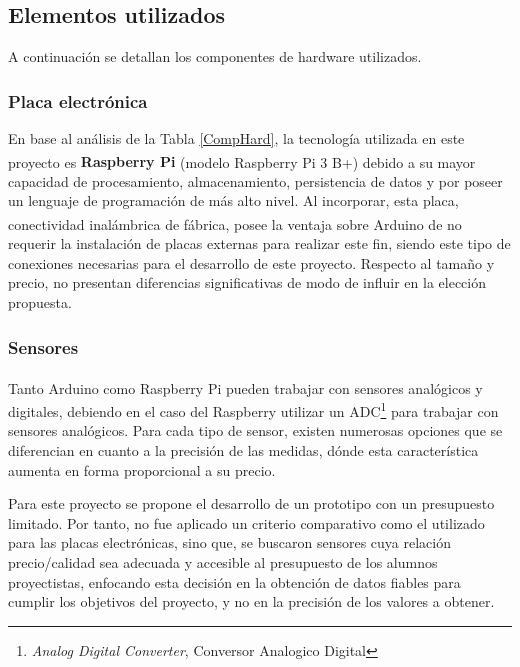         
    \subsection{Elementos utilizados}
    \label{subseccionElementosutilizados}
        \par A continuación se detallan los componentes de hardware utilizados.
        
        \subsubsection{Placa electrónica}
            \par En base al análisis de la Tabla \ref{CompHard}, la tecnología utilizada en este proyecto es \textbf{Raspberry\textsuperscript{\textregistered} Pi} (modelo Raspberry\textsuperscript{\textregistered} Pi 3 B+) debido a su mayor capacidad de procesamiento, almacenamiento, persistencia de datos y por poseer un lenguaje de programación de más alto nivel. Al incorporar, esta placa, conectividad inalámbrica de fábrica, posee la ventaja sobre Arduino\textsuperscript{\textregistered} de no requerir la instalación de placas externas para realizar este fin, siendo este tipo de conexiones necesarias para el desarrollo de este proyecto. Respecto al tamaño y precio, no presentan diferencias significativas de modo de influir en la elección propuesta.

        \subsubsection{Sensores}
            \par Tanto Arduino\textsuperscript{\textregistered} como Raspberry\textsuperscript{\textregistered} Pi pueden trabajar con sensores analógicos y digitales, debiendo en el caso del Raspberry\textsuperscript{\textregistered} utilizar un ADC\footnote{\textit{Analog Digital Converter}, Conversor Analogico Digital} para trabajar con sensores analógicos. Para cada tipo de sensor, existen numerosas opciones que se diferencian en cuanto a la precisión de las medidas, dónde esta característica aumenta en forma proporcional a su precio. 
            
            \par Para este proyecto se propone el desarrollo de un prototipo con un presupuesto limitado. Por tanto, no fue aplicado un criterio comparativo como el utilizado para las placas electrónicas, sino que, se buscaron sensores cuya relación precio/calidad sea adecuada y accesible al presupuesto de los alumnos proyectistas, enfocando esta decisión en la obtención de datos fiables para cumplir los objetivos del proyecto, y no en la precisión de los valores a obtener.
            
